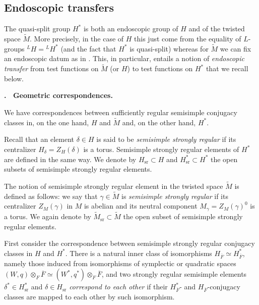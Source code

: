 \documentclass[12pt]{article}
\newenvironment{paragr}[1][]{\refstepcounter{subsubsection} \noindent \textbf{\thesubsubsection . \ #1}}{\medskip}
\numberwithin{equation}{section}
\def\tM{\widetilde{M}}
\DeclareMathOperator{\sr}{sr}
\begin{document}
	\subsection{Endoscopic transfers}
	
	The quasi-split group $H^*$ is both an endoscopic group of $H$ and of the twisted space $\tM$. More precisely, in the case of $H$ this just come from the equality of $L$-groups ${}^L H={}^L H^*$ (and the fact that $H^*$ is quasi-split) whereas for $\tM$ we can fix an endoscopic datum as in \cite{Waldtransfact}. This, in particular, entails a notion of {\it endoscopic transfer} from test functions on $\tM$ (or $H$) to test functions on $H^*$ that we recall below.
	
	\vspace{2mm}
	
	\begin{paragr}[Geometric correspondences.]
		
		We have correspondences between sufficiently regular semisimple conjugacy classes in, on the one hand, $H$ and $\tM$ and, on the other hand, $H^*$.
		
		Recall that an element $\delta\in H$ is said to be {\em semisimple strongly regular} if its centralizer $H_\delta=Z_H(\delta)$ is a torus. Semisimple strongly regular elements of $H^*$ are defined in the same way. We denote by $H_{\sr}\subset H$ and $H^*_{\sr}\subset H^*$ the open subsets of semisimple strongly regular elements.
		
		The notion of semisimple strongly regular element in the twisted space $\tM$ is defined as follows: we say that $\gamma\in \tM$ is {\em semisimple strongly regular} if its centralizer $Z_M(\gamma)$ in $M$ is abelian and its neutral component $M_\gamma=Z_M(\gamma)^0$ is a torus. We again denote by $\tM_{\sr}\subset \tM$ the open subset of semisimple strongly regular elements.
		
		First consider the correspondence between semisimple strongly regular conjugacy classes in $H$ and $H^*$. There is a natural inner class of isomorphisms $H_{\overline{F}}\simeq H^*_{\overline{F}}$, namely those induced from isomorphisms of symplectic or quadratic spaces $(W,q)\otimes_F \overline{F}\simeq (W^*,q^*)\otimes_F \overline{F}$, and two strongly regular semisimple elements $\delta^*\in H^*_{\sr}$ and $\delta\in H_{\sr}$ {\em correspond to each other} if their $H^*_{\overline{F}}$- and $H_{\overline{F}}$-conjugacy classes are mapped to each other by such isomorphism.
		
		
		

\end{paragr}
\end{document}
